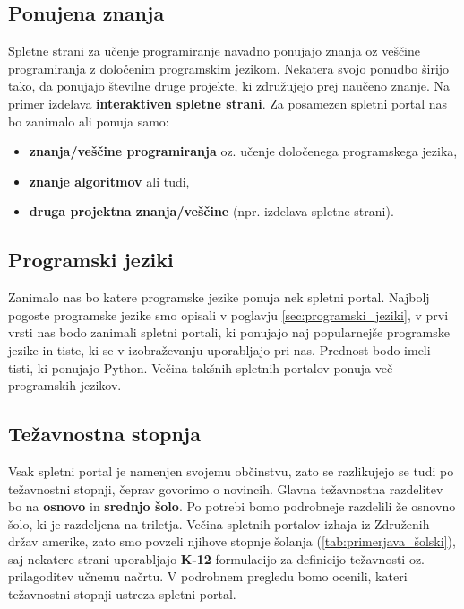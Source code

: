 \subsection{Ponujena znanja}
\label{sec:vsebina_problemsk_pristop}

Spletne strani za učenje programiranje navadno ponujajo znanja oz
veščine programiranja z določenim programskim jezikom. Nekatera svojo
ponudbo širijo tako, da ponujajo številne druge projekte, ki
združujejo prej naučeno znanje. Na primer izdelava
\textbf{interaktiven spletne strani}. Za posamezen spletni portal nas
bo zanimalo ali ponuja samo:

\begin{itemize}
  \tightlist
\item \textbf{znanja/veščine programiranja} oz. učenje določenega
  programskega jezika,
\item \textbf{znanje algoritmov} ali tudi,
\item \textbf{druga projektna znanja/veščine} (npr. izdelava spletne
  strani).
\end{itemize}


\subsection{Programski jeziki}
\label{sec:_zanaja_programski_jeziki}

Zanimalo nas bo katere programske jezike ponuja nek spletni
portal. Najbolj pogoste programske jezike smo opisali v poglavju
\ref{sec:programski_jeziki}, v prvi vrsti nas bodo zanimali spletni
portali, ki ponujajo naj popularnejše programske jezike in tiste, ki
se v izobraževanju uporabljajo pri nas. Prednost bodo imeli tisti,
ki ponujajo Python. Večina takšnih spletnih portalov ponuja več
programskih jezikov.

\subsection{Težavnostna stopnja}
\label{sec:težavnostna_stopnja}

Vsak spletni portal je namenjen svojemu občinstvu, zato se razlikujejo
se tudi po težavnostni stopnji, čeprav govorimo o novincih. Glavna
težavnostna razdelitev bo na \textbf{osnovo} in \textbf{srednjo
  šolo}. Po potrebi bomo podrobneje razdelili že osnovno šolo, ki je
razdeljena na triletja. Večina spletnih portalov izhaja iz Združenih
držav amerike, zato smo povzeli njihove stopnje šolanja
(\ref{tab:primerjava_šolski}), saj nekatere strani uporabljajo
\textbf{K-12} formulacijo za definicijo težavnosti oz. prilagoditev
učnemu načrtu. V podrobnem pregledu bomo ocenili, kateri težavnostni
stopnji ustreza spletni portal.

